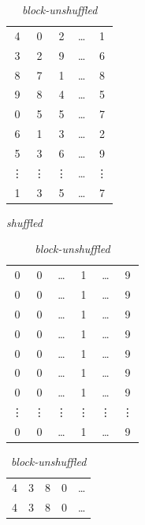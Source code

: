 \documentclass[review]{elsarticle}
\begin{document}
\begin{table}[!htb]
    \begin{subtable}{.3\linewidth}
      \centering
        \begin{tabular}{ | c | c | c | c | c | }
        \hline
            4 & 0 & 2 & \ldots & 1 \\
            3 & 2 & 9 & \ldots & 6 \\
            8 & 7 & 1 & \ldots & 8 \\
            9 & 8 & 4 & \ldots & 5 \\
            0 & 5 & 5 & \ldots & 7 \\
            6 & 1 & 3 & \ldots & 2 \\
            5 & 3 & 6 & \ldots & 9 \\
          \vdots & \vdots& \vdots & \ldots & \vdots  \\
            1 & 3 & 5 & \ldots & 7 \\
        \hline
        \end{tabular}
        \caption{\it shuffled}
    \end{subtable}%
    \begin{subtable}{.4\linewidth}
      \centering
        \begin{tabular}{ | c | c | c | c | c | c | }
        \hline
            0 & 0 & \ldots & 1 & \ldots & 9 \\
            0 & 0 & \ldots & 1 & \ldots & 9 \\
            0 & 0 & \ldots & 1 & \ldots & 9 \\
            0 & 0 & \ldots & 1 & \ldots & 9 \\
            0 & 0 & \ldots & 1 & \ldots & 9 \\
            0 & 0 & \ldots & 1 & \ldots & 9 \\
            0 & 0 & \ldots & 1 & \ldots & 9 \\
            \vdots & \vdots& \vdots & \vdots &  \vdots & \vdots  \\
            0 & 0 & \ldots & 1 & \ldots & 9 \\
        \hline
        \end{tabular}
        \caption{\it block-unshuffled}
    \end{subtable}%
    \begin{subtable}{.4\linewidth}
      \centering
        \begin{tabular}{ | c | c | c | c | c | }
        \hline
            4 & 3 & 8 & 0 & \ldots \\
            4 & 3 & 8 & 0 & \ldots \\

\end{tabular}
\end{subtable}
\end{table}
\end{document}
